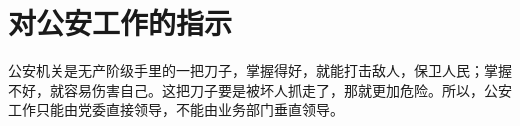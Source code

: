 \section[对公安工作的指示（一九六七年八月）]{对公安工作的指示}


公安机关是无产阶级手里的一把刀子，掌握得好，就能打击敌人，保卫人民；掌握不好，就容易伤害自己。这把刀子要是被坏人抓走了，那就更加危险。所以，公安工作只能由党委直接领导，不能由业务部门垂直领导。

